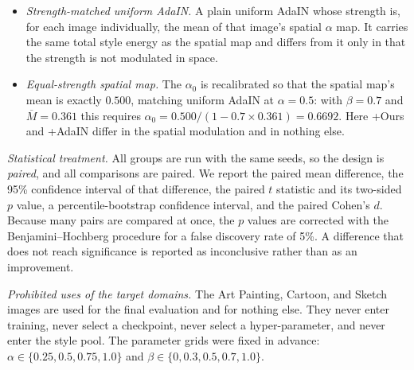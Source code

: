 \begin{itemize}
\item \textit{Strength-matched uniform AdaIN.} A plain uniform AdaIN whose strength is, for each image individually, the mean of that image's spatial $\alpha$ map. It carries the same total style energy as the spatial map and differs from it only in that the strength is not modulated in space.
\item \textit{Equal-strength spatial map.} The $\alpha_0$ is recalibrated so that the spatial map's mean is exactly $0.500$, matching uniform AdaIN at $\alpha = 0.5$: with $\beta = 0.7$ and $\overline{M} = 0.361$ this requires $\alpha_0 = 0.500/(1-0.7\times0.361) = 0.6692$. Here +Ours and +AdaIN differ in the spatial modulation and in nothing else.
\end{itemize}

\textit{Statistical treatment.} All groups are run with the same seeds, so the design is \emph{paired}, and all comparisons are paired. We report the paired mean difference, the 95\% confidence interval of that difference, the paired $t$ statistic and its two-sided $p$ value, a percentile-bootstrap confidence interval, and the paired Cohen's $d$. Because many pairs are compared at once, the $p$ values are corrected with the Benjamini--Hochberg procedure for a false discovery rate of 5\%. A difference that does not reach significance is reported as inconclusive rather than as an improvement.

\textit{Prohibited uses of the target domains.} The Art Painting, Cartoon, and Sketch images are used for the final evaluation and for nothing else. They never enter training, never select a checkpoint, never select a hyper-parameter, and never enter the style pool. The parameter grids were fixed in advance: $\alpha \in \{0.25, 0.5, 0.75, 1.0\}$ and $\beta \in \{0, 0.3, 0.5, 0.7, 1.0\}$.
